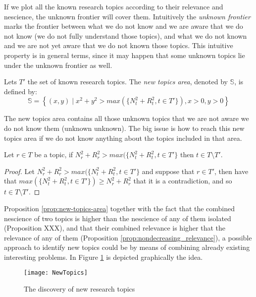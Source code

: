 If we plot all the known research topics according to their relevance and nescience, the unknown frontier will cover them. Intuitively the \emph{unknown frontier} marks the frontier between what we do not know and we are aware that we do not know (we do not fully understand those topics), and what we do not known and we are not yet aware that we do not known those topics. This intuitive property is in general terms, since it may happen that some unknown topics lie under the unknown frontier as well.

\begin{definition}
Lets $T'$ the set of known research topics. The \emph{new topics area}, denoted by $\mathbb{S}$, is defined by:
\[
\mathbb{S} = \left\{(x,y) \mid x^{2}+y^{2}>max(\{N^2_{t} + R^2_{t}, t \in T'\}),x>0,y>0\right\} 
\]
\end{definition}

The new topics area contains all those unknown topics that we are not aware we do not know them (unknown unknown). The big issue is how to reach this new topics area if we do not know anything about the topics included in that area.

\begin{proposition}
\label{prop:new-topics-area}
Let $r \in T$ be a topic, if  $N^2_{r} + R^2_{r} > max(\{N^2_{t} + R^2_{t}, t \in T'\}$ then $t \in T \setminus T'$.
\end{proposition}
\begin{proof}
Let $N^2_{r} + R^2_{r} > max(\{N^2_{t} + R^2_{t}, t \in T'\}$ and suppose that $r \in T'$, then have that $max(\{N^2_{t} + R^2_{t}, t \in T'\}) \geq N^2_{r} + R^2_{r}$ that it is a contradiction, and so $t \in T \setminus T'$.
\end{proof}

Proposition \ref{prop:new-topics-area} together with the fact that the combined nescience of two topics is higher than the nescience of any of them isolated (Proposition {\color{red} XXX}), and that their combined relevance is higher that the relevance of any of them (Proposition \ref{prop:nondecreasing_relevance}), a possible approach to identify new topics could be by means of combining already existing interesting problems. In Figure \ref{fig:New-Topics} is depicted graphically the idea.

\begin{figure}[h]
\centering\texttt{[image: NewTopics]}
\caption{\label{fig:New-Topics}The discovery of new research topics}
\end{figure}

